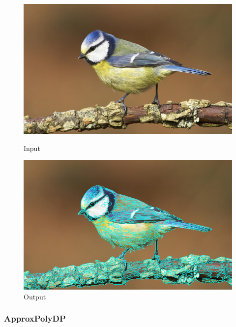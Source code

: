 \begin{figure}[htb]
    \centering
    \begin{minipage}[t]{0.45\linewidth}
        \centering
        \includegraphics[width=\linewidth]{pics/bildverarbeitungsalgos/input.png}
        \caption{Input}
        \label{maai:getcounturs:input}
    \end{minipage}
    \hfill
    \begin{minipage}[t]{0.45\linewidth}
        \centering
        \includegraphics[width=\linewidth]{pics/bildverarbeitungsalgos/getcounturs_output.png}
        \caption{Output}
        \label{maai:getcounturs:output}
    \end{minipage}
\end{figure}

\subsubsection{ApproxPolyDP}\label{maai:approxpolydp:header}

